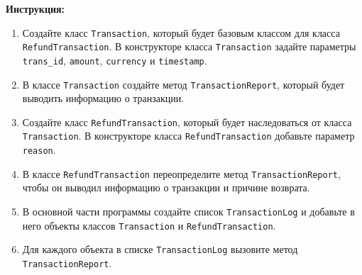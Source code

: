 \begin{enumerate}
\textbf{Инструкция:}
\begin{enumerate}
    \item Создайте класс \texttt{Transaction}, который будет базовым классом для класса \texttt{RefundTransaction}. В конструкторе класса \texttt{Transaction} задайте параметры \texttt{trans\_id}, \texttt{amount}, \texttt{currency} и \texttt{timestamp}.
    \item В классе \texttt{Transaction} создайте метод \texttt{TransactionReport}, который будет выводить информацию о транзакции.
    \item Создайте класс \texttt{RefundTransaction}, который будет наследоваться от класса \texttt{Transaction}. В конструкторе класса \texttt{RefundTransaction} добавьте параметр \texttt{reason}.
    \item В классе \texttt{RefundTransaction} переопределите метод \texttt{TransactionReport}, чтобы он выводил информацию о транзакции и причине возврата.
    \item В основной части программы создайте список \texttt{TransactionLog} и добавьте в него объекты классов \texttt{Transaction} и \texttt{RefundTransaction}.
    \item Для каждого объекта в списке \texttt{TransactionLog} вызовите метод \texttt{TransactionReport}.
\end{enumerate}
\end{enumerate}

